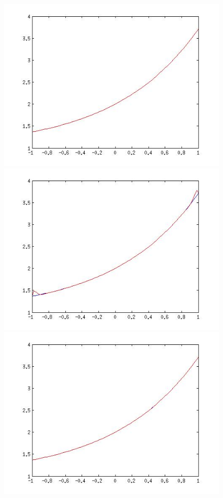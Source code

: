 \begin{enumerate}
\begin{svol}
\begin{figure}[!ht]
\begin{center}
\includegraphics[scale=.35]{fig/es6-1e.jpg}
\includegraphics[scale=.35]{fig/es6-1c.jpg}
\includegraphics[scale=.35]{fig/es6-1f.jpg}

\end{center}
\end{figure}
\end{svol}
\end{enumerate}
